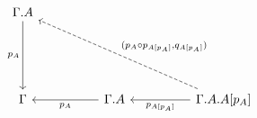 \[\begin{tikzcd}
	{\Gamma.A} \\
	\\
	\\
	\Gamma && {\Gamma.A} && {\Gamma.A.A[p_{A}]}
	\arrow["{p_{A}}", from=4-3, to=4-1]
	\arrow["{p_{A[p_{A}]}}", from=4-5, to=4-3]
	\arrow["{p_{A}}"', from=1-1, to=4-1]
	\arrow["{(p_{A} \circ p_{A[p_{A}]}, q_{A[p_{A}]})}"', dashed, from=4-5, to=1-1]
\end{tikzcd}\]